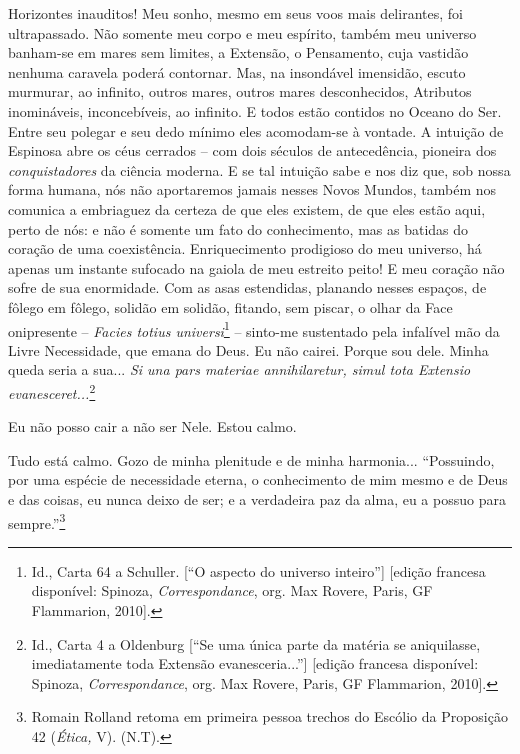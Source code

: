Horizontes inauditos! Meu sonho, mesmo em seus voos mais delirantes, foi
ultrapassado. Não somente meu corpo e meu espírito, também meu universo
banham-se em mares sem limites, a Extensão, o Pensamento, cuja vastidão
nenhuma caravela poderá contornar. Mas, na insondável imensidão, escuto
murmurar, ao infinito, outros mares, outros mares desconhecidos,
Atributos inomináveis, inconcebíveis, ao infinito. E todos estão
contidos no Oceano do Ser. Entre seu polegar e seu dedo mínimo eles
acomodam-se à vontade. A intuição de Espinosa abre os céus cerrados --
com dois séculos de antecedência, pioneira dos \emph{conquistadores} da
ciência moderna. E se tal intuição sabe e nos diz que, sob nossa forma
humana, nós não aportaremos jamais nesses Novos Mundos, também nos
comunica a embriaguez da certeza de que eles existem, de que eles estão
aqui, perto de nós: e não é somente um fato do conhecimento, mas as
batidas do coração de uma coexistência. Enriquecimento prodigioso do meu
universo, há apenas um instante sufocado na gaiola de meu estreito
peito! E meu coração não sofre de sua enormidade. Com as asas
estendidas, planando nesses espaços, de fôlego em fôlego, solidão em
solidão, fitando, sem piscar, o olhar da Face onipresente --
\emph{Facies totius universi}\footnote{Id., Carta 64 a Schuller. {[}``O
  aspecto do universo inteiro''{]} {[}edição francesa disponível:
  Spinoza, \emph{Correspondance}, org. Max Rovere, Paris, GF Flammarion,
  2010{]}.} -- sinto-me sustentado pela infalível mão da Livre
Necessidade, que emana do Deus. Eu não cairei. Porque sou dele. Minha
queda seria a sua... \emph{Si una pars materiae annihilaretur, simul
tota Extensio evanesceret...}\footnote{Id., Carta 4 a Oldenburg {[}``Se
  uma única parte da matéria se aniquilasse, imediatamente toda Extensão
  evanesceria...''{]} {[}edição francesa disponível: Spinoza,
  \emph{Correspondance}, org. Max Rovere, Paris, GF Flammarion, 2010{]}.}

Eu não posso cair a não ser Nele. Estou calmo.

Tudo está calmo. Gozo de minha plenitude e de minha harmonia...
``Possuindo, por uma espécie de necessidade eterna, o conhecimento de
mim mesmo e de Deus e das coisas, eu nunca deixo de ser; e a verdadeira
paz da alma, eu a possuo para sempre.''\footnote{Romain Rolland retoma
  em primeira pessoa trechos do Escólio da Proposição 42 (\emph{Ética,}
  V). (N.T).}

